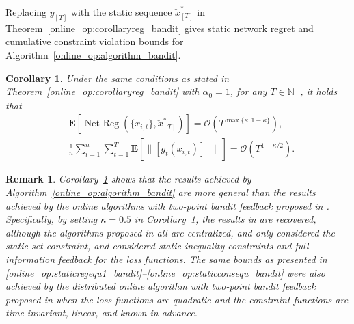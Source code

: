 \documentclass[12pt,draftcls,onecolumn]{IEEEtran}%
\newtheorem{remark}{Remark}
\newtheorem{corollary}{Corollary}
\DeclareMathOperator{\NetReg}{Net-Reg}
\begin{document}
Replacing $y_{[T]}$ with the static sequence $\check{x}^*_{[T]}$ in Theorem~\ref{online_op:corollaryreg_bandit} gives static network regret and cumulative constraint violation bounds for Algorithm~\ref{online_op:algorithm_bandit}.
\begin{corollary}\label{online_op:theoremstatic_bandit}
	Under the same conditions as stated in Theorem~\ref{online_op:corollaryreg_bandit} with $\alpha_0=1$, for any $T\in\mathbb{N}_+$, it holds that
	\begin{align}
		&\mathbf{E}[\NetReg(\{x_{i,t}\},\check{x}^*_{[T]})]
		=\mathcal{O}(T^{\max\{\kappa,1-\kappa\}}),\label{online_op:staticregequ1_bandit}\\
		&\frac{1}{n}\sum_{i=1}^n\sum_{t=1}^T\mathbf{E}[\|[g_{t}(x_{i,t})]_+\|]=
		\mathcal{O}(T^{1-\kappa/2}).
		\label{online_op:staticconsequ_bandit}
	\end{align}
\end{corollary}
\begin{remark}\label{online_op:remark_static_bandit}
	Corollary~\ref{online_op:theoremstatic_bandit} shows that the results achieved by Algorithm~\ref{online_op:algorithm_bandit} are more general than the results achieved by the online algorithms with two-point bandit feedback proposed in \cite{agarwal2010optimal,shamir2017optimal,mahdavi2012trading,yuan2021distributed}. Specifically, by setting $\kappa=0.5$ in Corollary~\ref{online_op:theoremstatic_bandit}, the results in \cite{agarwal2010optimal,shamir2017optimal,mahdavi2012trading} are recovered, although the algorithms proposed in \cite{agarwal2010optimal,shamir2017optimal,mahdavi2012trading} all are centralized, and \cite{agarwal2010optimal,shamir2017optimal} only considered the static set constraint, and \cite{mahdavi2012trading} considered static inequality constraints and full-information feedback for the loss functions. The same bounds as presented in \eqref{online_op:staticregequ1_bandit}--\eqref{online_op:staticconsequ_bandit} were also achieved by the distributed online algorithm with two-point bandit feedback proposed in \cite{yuan2021distributed} when the loss functions are quadratic and the constraint functions are time-invariant, linear, and known in advance.
\end{remark}
\end{document}
